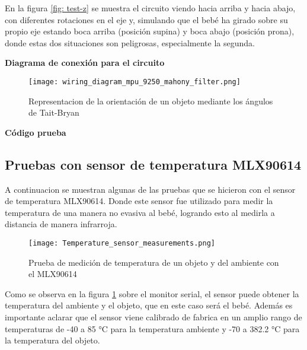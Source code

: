         En la figura \ref{fig: test-z} se muestra el circuito viendo hacia arriba y hacia abajo, con diferentes rotaciones en el eje y,
        simulando que el bebé ha girado sobre su propio eje estando boca arriba (posición supina) y boca abajo (posición prona), donde estas
        dos situaciones son peligrosas, especialmente la segunda.\newline

        \textbf{Diagrama de conexión para el circuito}
        \begin{figure}[htp!]
            \centering
                \texttt{[image: wiring\_diagram\_mpu\_9250\_mahony\_filter.png]}
                \caption{Representacion de la orientación de un objeto mediante los ángulos de Tait-Bryan}
            \end{figure}
            \FloatBarrier 
        \textbf{Código prueba}

        \lstset{style=mystyle}

        

        \subsection{Pruebas con sensor de temperatura MLX90614}

        A continuacion se muestran algunas de las pruebas que se hicieron con el sensor de temperatura MLX90614.
        Donde este sensor fue utilizado para medir la temperatura de una manera no evasiva al bebé, logrando esto 
        al medirla a distancia de manera infrarroja. 

        \begin{figure}[htp!]
            \centering
                 \texttt{[image: Temperature\_sensor\_measurements.png]}
                  \caption{Prueba de medición de temperatura de un objeto y del ambiente con el MLX90614}
                  \label{fig: temperature_measurements}
        \end{figure}
        \FloatBarrier 

        Como se observa en la figura \ref{fig: temperature_measurements} sobre el monitor serial, el sensor puede obtener la temperatura del 
        ambiente y el objeto, que en este caso será el bebé. Además es importante aclarar que el sensor viene calibrado de fabrica en un amplio rango de temperaturas de 
        -40 a 85 °C para la temperatura ambiente y -70 a 382.2 °C para la temperatura del objeto.\newline

